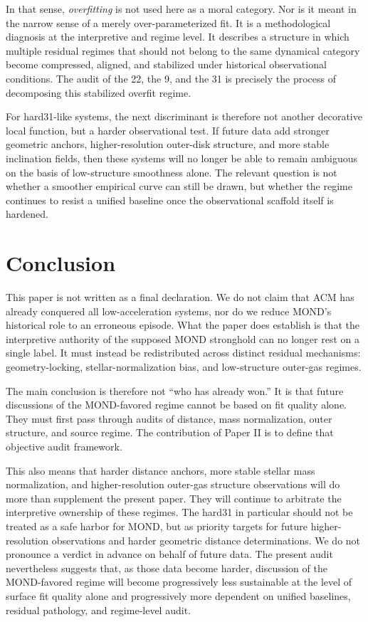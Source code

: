 ﻿\documentclass[aps,prd,twocolumn,superscriptaddress,longbibliography,nofootinbib,floatfix,10pt]{revtex4-2}
\begin{document}
In that sense, \emph{overfitting} is not used here as a moral category. Nor is
it meant in the narrow sense of a merely over-parameterized fit. It is a
methodological diagnosis at the interpretive and regime level. It describes a
structure in which multiple residual regimes that should not belong to the same
dynamical category become compressed, aligned, and stabilized under historical
observational conditions. The audit of the 22, the 9, and the 31 is precisely
the process of decomposing this stabilized overfit regime.

For hard31-like systems, the next discriminant is therefore not another
decorative local function, but a harder observational test. If future data add
stronger geometric anchors, higher-resolution outer-disk structure, and more
stable inclination fields, then these systems will no longer be able to remain
ambiguous on the basis of low-structure smoothness alone. The relevant
question is not whether a smoother empirical curve can still be drawn, but
whether the regime continues to resist a unified baseline once the
observational scaffold itself is hardened.

\section{Conclusion}

This paper is not written as a final declaration. We do not claim that ACM has
already conquered all low-acceleration systems, nor do we reduce MOND's
historical role to an erroneous episode. What the paper does establish is that
the interpretive authority of the supposed MOND stronghold can no longer rest
on a single label. It must instead be redistributed across distinct residual
mechanisms: geometry-locking, stellar-normalization bias, and low-structure
outer-gas regimes.

The main conclusion is therefore not ``who has already won.'' It is that
future discussions of the MOND-favored regime cannot be based on fit quality
alone. They must first pass through audits of distance, mass normalization,
outer structure, and source regime. The contribution of Paper II is to define
that objective audit framework.

This also means that harder distance anchors, more stable stellar mass
normalization, and higher-resolution outer-gas structure observations will do
more than supplement the present paper. They will continue to arbitrate the
interpretive ownership of these regimes. The hard31 in particular should not be
treated as a safe harbor for MOND, but as priority targets for future
higher-resolution observations and harder geometric distance determinations. We
do not pronounce a verdict in advance on behalf of future data. The present
audit nevertheless suggests that, as those data become harder, discussion of
the MOND-favored regime will become progressively less sustainable at the level
of surface fit quality alone and progressively more dependent on unified
baselines, residual pathology, and regime-level audit.
\end{document}
